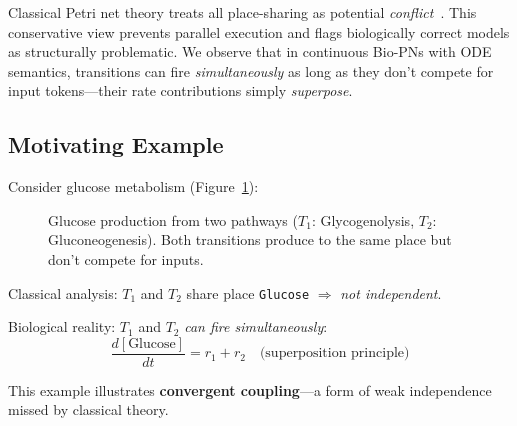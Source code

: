\documentclass{article}
\begin{document}
Classical Petri net theory treats all place-sharing as potential \emph{conflict}~\cite{Reisig2013}. This conservative view prevents parallel execution and flags biologically correct models as structurally problematic. We observe that in continuous Bio-PNs with ODE semantics, transitions can fire \emph{simultaneously} as long as they don't compete for input tokens---their rate contributions simply \emph{superpose}.

\subsection{Motivating Example}

Consider glucose metabolism (Figure~\ref{fig:glucose_example}):

\begin{figure}[t]
\centering
{}
\caption{Glucose production from two pathways ($T_1$: Glycogenolysis, $T_2$: Gluconeogenesis). Both transitions produce to the same place but don't compete for inputs.}
\label{fig:glucose_example}
\end{figure}

Classical analysis: $T_1$ and $T_2$ share place \texttt{Glucose} $\Rightarrow$ \emph{not independent}.

Biological reality: $T_1$ and $T_2$ \emph{can fire simultaneously}:
\begin{equation}
\frac{d[\text{Glucose}]}{dt} = r_1 + r_2 \quad \text{(superposition principle)}
\end{equation}

This example illustrates \textbf{convergent coupling}---a form of weak independence missed by classical theory.
\end{document}
